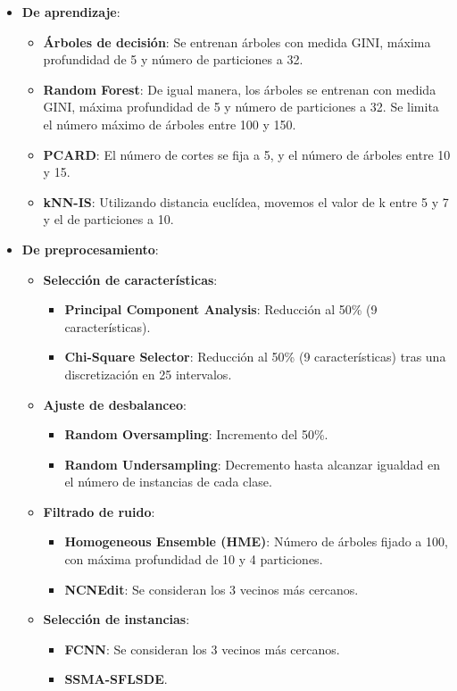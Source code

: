 \begin{itemize}
    \item \textbf{De aprendizaje}: \begin{itemize}
        \item \textbf{Árboles de decisión}: Se entrenan árboles con medida GINI, máxima profundidad de 5 y número de particiones a 32.
        \item \textbf{Random Forest}: De igual manera, los árboles se entrenan con medida GINI, máxima profundidad de 5 y número de particiones a 32. Se limita el número máximo de árboles entre 100 y 150.
        \item \textbf{PCARD}: El número de cortes se fija a 5, y el número de árboles entre 10 y 15.
        \item \textbf{kNN-IS}: Utilizando distancia euclídea, movemos el valor de k entre 5 y 7 y el de particiones a 10.
    \end{itemize}
    \item \textbf{De preprocesamiento}: \begin{itemize}
        \item \textbf{Selección de características}: \begin{itemize}
            \item \textbf{Principal Component Analysis}: Reducción al 50\% (9 características).
            \item \textbf{Chi-Square Selector}: Reducción al 50\% (9 características) tras una discretización en 25 intervalos.
        \end{itemize}
        \item \textbf{Ajuste de desbalanceo}: \begin{itemize}
            \item \textbf{Random Oversampling}: Incremento del 50\%.
            \item \textbf{Random Undersampling}: Decremento hasta alcanzar igualdad en el número de instancias de cada clase.
        \end{itemize}
        \item \textbf{Filtrado de ruido}: \begin{itemize}
            \item \textbf{Homogeneous Ensemble (HME)}: Número de árboles fijado a 100, con máxima profundidad de 10 y 4 particiones.
            \item \textbf{NCNEdit}: Se consideran los 3 vecinos más cercanos.
        \end{itemize}
        \item \textbf{Selección de instancias}: \begin{itemize}
            \item \textbf{FCNN}: Se consideran los 3 vecinos más cercanos.
            \item \textbf{SSMA-SFLSDE}.
        \end{itemize}
    \end{itemize}
\end{itemize}
